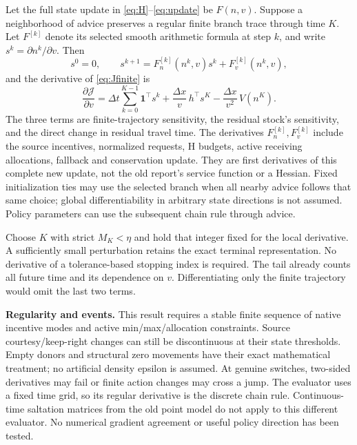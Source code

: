 \documentclass[10pt,a4paper]{article}
\begin{document}
Let the full state update in \eqref{eq:H}--\eqref{eq:update} be $F(n,v)$.
Suppose a neighborhood of advice preserves a regular finite branch trace
through time $K$. Let $F^{[k]}$ denote its selected smooth arithmetic formula
at step $k$, and write $s^k=\partial n^k/\partial v$. Then
\begin{equation}
 s^0=0,\qquad s^{k+1}=F^{[k]}_n(n^k,v)s^k+F^{[k]}_v(n^k,v), \label{eq:sens}
\end{equation}
and the derivative of \eqref{eq:Jfinite} is
\begin{equation}
 \frac{\partial\mathcal J}{\partial v}=
 \Delta t\sum_{k=0}^{K-1}\mathbf1^\top s^k+
 \frac{\Delta x}{v}\,h^\top s^K-
 \frac{\Delta x}{v^2}\,V(n^K). \label{eq:gradient}
\end{equation}
The three terms are finite-trajectory sensitivity, the residual stock's
sensitivity, and the direct change in residual travel time. The derivatives
$F^{[k]}_n,F^{[k]}_v$ include the source incentives, normalized requests, H budgets,
active receiving allocations, fallback and conservation update. They are
first derivatives of this complete new update, not the old report's service
function or a Hessian. Fixed initialization ties may use the selected branch
when all nearby advice follows that same choice; global differentiability
in arbitrary state directions is not assumed. Policy parameters can use
the subsequent chain rule through advice.

Choose $K$ with strict $M_K<\eta$ and hold that integer fixed for the local
derivative. A sufficiently small perturbation retains the exact terminal
representation. No derivative of a tolerance-based stopping index is
required. The tail already counts all future time and its dependence on $v$.
Differentiating only the finite trajectory would omit the last two terms.

\textbf{Regularity and events.} This result requires a stable finite sequence
of native incentive modes and active min/max/allocation constraints. Source
courtesy/keep-right changes can still be discontinuous at their state
thresholds. Empty donors and structural zero movements have their exact
mathematical treatment; no artificial density epsilon is assumed. At genuine
switches, two-sided derivatives may fail or finite action changes may cross
a jump. The evaluator uses a fixed time grid, so its regular derivative is
the discrete chain rule. Continuous-time saltation matrices from the old
point model do not apply to this different evaluator. No numerical gradient
agreement or useful policy direction has been tested.
\end{document}
